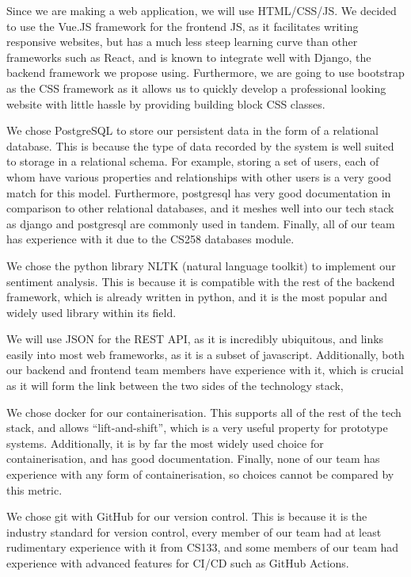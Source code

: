 \documentclass[10pt]{article}
\begin{document}
Since we are making a web application, we will use HTML/CSS/JS. We decided to
use the Vue.JS framework for the frontend JS, as it facilitates writing
responsive websites, but has a much less steep learning curve than other
frameworks such as React, and is known to integrate well with Django, the
backend framework we propose using. Furthermore, we are going to use bootstrap
as the CSS framework as it allows us to quickly develop a professional looking
website with little hassle by providing building block CSS classes. 

We chose PostgreSQL to store our persistent data in the form of a relational
database. This is because the type of data recorded by the system is well suited
to storage in a relational schema. For example, storing a set of users, each of
whom have various properties and relationships with other users is a very good
match for this model. Furthermore, postgresql has very good documentation in
comparison to other relational databases, and it meshes well into our tech stack
as django and postgresql are commonly used in tandem. Finally, all of our team
has experience with it due to the CS258 databases module.

We chose the python library NLTK (natural language toolkit) to implement our
sentiment analysis. This is because it is compatible with the rest of the
backend framework, which is already written in python, and it is the most
popular and widely used library within its field.

We will use JSON for the REST API, as it is incredibly ubiquitous, and links
easily into most web frameworks, as it is a subset of javascript. Additionally,
both our backend and frontend team members have experience with it, which is
crucial as it will form the link between the two sides of the technology stack,

We chose docker for our containerisation. This supports all of the rest of the
tech stack, and allows “lift-and-shift”, which is a very useful property for
prototype systems. Additionally, it is by far the most widely used choice for
containerisation, and has good documentation. Finally, none of our team has
experience with any form of containerisation, so choices cannot be compared by
this metric.

We chose git with GitHub for our version control. This is because it is the
industry standard for version control, every member of our team had at least
rudimentary experience with it from CS133, and some members of our team had
experience with advanced features for CI/CD such as GitHub Actions.
\end{document}
